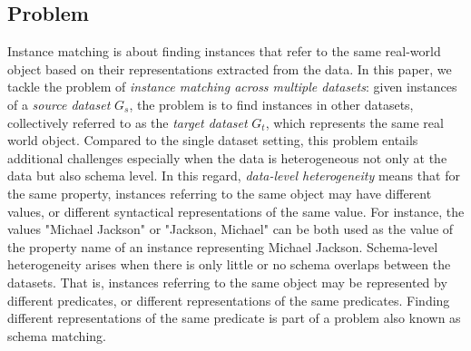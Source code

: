 \subsection{Problem} Instance matching is about finding instances that refer to the same real-world object based on their representations extracted from the data. In this paper, we tackle the problem of \emph{instance matching across multiple datasets}: given instances of a \emph{source dataset} $G_s$, the problem is to find instances in other datasets, collectively referred to as the \emph{target dataset} $G_t$, which represents the same real world object. Compared to the single dataset setting, this problem entails additional challenges especially when the data is heterogeneous not only at the data but also schema level. In this regard, \emph{data-level heterogeneity} means that for the same property, instances referring to the same object may have different values, or different syntactical representations of the same value. For instance, the values "Michael Jackson" or "Jackson, Michael" can be both used as the value of the property name of an instance representing  Michael Jackson. Schema-level heterogeneity arises when there is only little or no schema overlaps between the datasets. That is, instances referring to the same object may be represented by different predicates, or different representations of the same predicates. Finding different representations of the same predicate is part of a problem also known as schema matching. 

